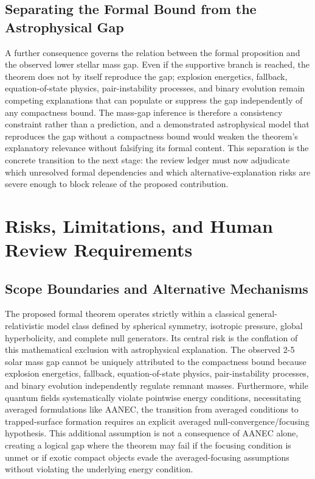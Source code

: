 \documentclass[conference]{IEEEtran}
\begin{document}
\subsection{Separating the Formal Bound from the Astrophysical Gap}
A further consequence governs the relation between the formal proposition and the observed lower stellar mass gap. Even if the supportive branch is reached, the theorem does not by itself reproduce the gap; explosion energetics, fallback, equation-of-state physics, pair-instability processes, and binary evolution remain competing explanations that can populate or suppress the gap independently of any compactness bound. The mass-gap inference is therefore a consistency constraint rather than a prediction, and a demonstrated astrophysical model that reproduces the gap without a compactness bound would weaken the theorem's explanatory relevance without falsifying its formal content. This separation is the concrete transition to the next stage: the review ledger must now adjudicate which unresolved formal dependencies and which alternative-explanation risks are severe enough to block release of the proposed contribution.~\cite{cite_7a407c865faafd11,cite_f634820e22d7a238,cite_fd0f77b2a173c0ab}

\section{Risks, Limitations, and Human Review Requirements}
\subsection{Scope Boundaries and Alternative Mechanisms}
The proposed formal theorem operates strictly within a classical general-relativistic model class defined by spherical symmetry, isotropic pressure, global hyperbolicity, and complete null generators. Its central risk is the conflation of this mathematical exclusion with astrophysical explanation. The observed 2-5 solar mass gap cannot be uniquely attributed to the compactness bound because explosion energetics, fallback, equation-of-state physics, pair-instability processes, and binary evolution independently regulate remnant masses. Furthermore, while quantum fields systematically violate pointwise energy conditions, necessitating averaged formulations like AANEC, the transition from averaged conditions to trapped-surface formation requires an explicit averaged null-convergence/focusing hypothesis. This additional assumption is not a consequence of AANEC alone, creating a logical gap where the theorem may fail if the focusing condition is unmet or if exotic compact objects evade the averaged-focusing assumptions without violating the underlying energy condition.~\cite{cite_789b47fb0241d9ae,cite_7a407c865faafd11,cite_c369df652181e8f7,cite_cc5bc07a219047b4,cite_f634820e22d7a238,cite_0ed84243cf171bc4}
\end{document}
